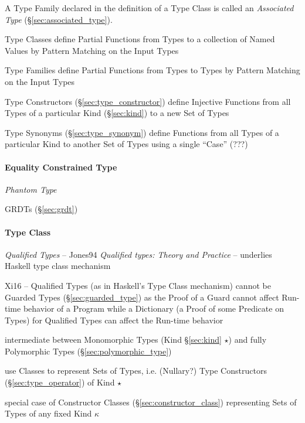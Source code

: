 A Type Family declared in the definition of a Type Class is called an
\emph{Associated Type} (\S\ref{sec:associated_type}).

Type Classes define Partial Functions from Types to a collection of
Named Values by Pattern Matching on the Input Types

\fist Type Families define Partial Functions from Types to Types by
Pattern Matching on the Input Types

\fist Type Constructors (\S\ref{sec:type_constructor}) define
Injective Functions from all Types of a particular Kind
(\S\ref{sec:kind}) to a new Set of Types

\fist Type Synonyms (\S\ref{sec:type_synonym}) define Functions from
all Types of a particular Kind to another Set of Types using a single
``Case'' (???) %



\paragraph{Equality Constrained Type}
\label{sec:equality_constrained}\hfill

\emph{Phantom Type}

\fist GRDTs (\S\ref{sec:grdt})



\paragraph{Type Class}\label{sec:type_class}\hfill

\emph{Qualified Types} -- \cite{jones94} Jones94 \emph{Qualified
  types: Theory and Practice} -- underlies Haskell type class
mechanism

Xi16 -- Qualified Types (as in Haskell's Type Class mechanism) cannot
be Guarded Types (\S\ref{sec:guarded_type}) as the Proof of a Guard
cannot affect Run-time behavior of a Program while a Dictionary (a
Proof of some Predicate on Types) for Qualified Types can affect the
Run-time behavior

\cite{jones95}

intermediate between Monomorphic Types (Kind \S\ref{sec:kind} $\star$)
and fully Polymorphic Types (\S\ref{sec:polymorphic_type})

use Classes to represent Sets of Types, i.e. (Nullary?) Type
Constructors (\S\ref{sec:type_operator}) of Kind $\star$

special case of Constructor Classes (\S\ref{sec:constructor_class})
representing Sets of Types of any fixed Kind $\kappa$



